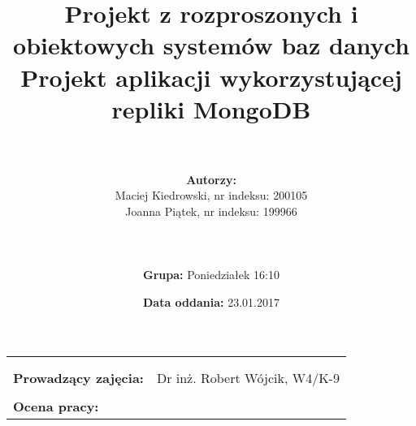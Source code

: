 \documentclass{article}
\title{Projekt z rozproszonych i obiektowych systemów baz danych\\
	\vspace{5mm}
	\textbf{Projekt aplikacji wykorzystującej repliki MongoDB}
	}
\author{\\
	\\\textbf{Autorzy:}
	\\Maciej Kiedrowski, nr indeksu: 200105
	\\Joanna Piątek, nr indeksu: 199966
	\\\\
	\\
	\\\textbf{Grupa:} Poniedziałek 16:10}
\date{\textbf{Data oddania:} 23.01.2017}
\begin{document}
\maketitle %

\begin{center}
\begin{tabular}{l r}
\\\\\\
\textbf{Prowadzący zajęcia:} & Dr inż. Robert Wójcik, W4/K-9 \\
\\\textbf{Ocena pracy:} &  %
\end{tabular}
\end{center}
 
\newpage
\tableofcontents 	%
\newpage
\listoffigures
\newpage


\newpage

\newpage

\newpage

\newpage

\newpage

\newpage

\newpage


\end{document}
